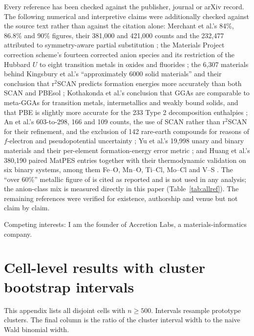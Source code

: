 \documentclass[11pt]{article}
\begin{document}
Every reference has been checked against the publisher, journal or arXiv record. The following
numerical and interpretive claims were additionally checked against the source text rather
than against the citation alone: Merchant et al.'s 84\%, 86.8\% and 90\% figures, their
381{,}000 and 421{,}000 counts and the 232{,}477 attributed to symmetry-aware partial
substitution \citep{merchant2023}; the Materials Project correction scheme's fourteen
corrected anion species and its restriction of the Hubbard $U$ to eight transition metals
in oxides and fluorides \citep{mpanion}; the 6{,}307 materials behind Kingsbury et al.'s ``approximately 6000
solid materials'' and their conclusion that r$^2$SCAN predicts formation energies more accurately
than both SCAN and PBEsol \citep{kingsbury2022prm}; Kothakonda et al.'s conclusion that
GGAs are comparable to meta-GGAs for transition metals, intermetallics and weakly bound
solids, and that PBE is slightly more accurate for the 233 Type 2 decomposition enthalpies
\citep{kothakonda2023}; An et al.'s 603-to-298, 166 and 109 counts, the use of SCAN rather
than r$^2$SCAN for their refinement, and the exclusion of 142 rare-earth compounds for
reasons of $f$-electron and pseudopotential uncertainty \citep{an2026}; Yu et al.'s 19{,}998
unary and binary materials and their per-element formation-energy error metric
\citep{yu2024}; and Huang et al.'s 380{,}190 paired MatPES entries together with their
thermodynamic validation on six binary systems, among them Fe--O, Mn--O, Ti--Cl, Mo--Cl
and V--S \citep{huang2026}. The ``over 60\%'' metallic figure of \citet{liu2024} is cited as reported and is not used in any analysis; the anion-class mix
is measured directly in this paper (Table~\ref{tab:allref}). The remaining references were
verified for existence, authorship and venue but not claim by claim.

Competing interests: I am the founder of Accretion Labs, a materials-informatics company.

\appendix

\section{Cell-level results with cluster bootstrap intervals}\label{app:cells}

This appendix lists all disjoint cells with $n \ge 500$. Intervals resample prototype
clusters. The final column is the ratio of the cluster interval width to the naive Wald binomial width.
\end{document}

